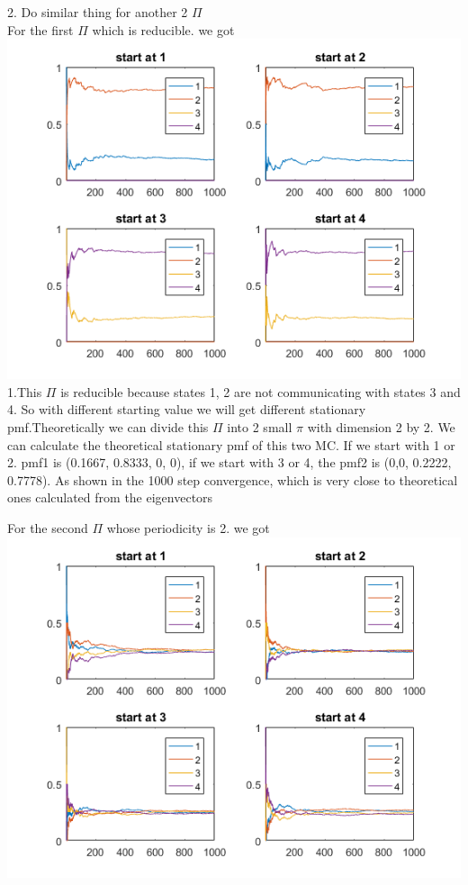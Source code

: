 \documentclass[11pt]{article}
\begin{document}
2. Do similar thing for another 2 $\Pi$\\
For the first $\Pi$ which is reducible. we got\\
\includegraphics[scale=1]{hw2p2.png}
1.This $\Pi$ is reducible because states 1, 2 are not communicating with states 3 and 4. So with different starting value we will get different stationary pmf.Theoretically we can divide this $\Pi$ into 2 small $\pi$ with dimension 2 by 2. We can calculate the theoretical stationary pmf of this two MC. If we start with 1 or 2. pmf1 is (0.1667, 0.8333, 0, 0), if we start with 3 or 4, the pmf2 is (0,0, 0.2222, 0.7778). As shown in the 1000 step convergence, which is very close to theoretical ones calculated from the eigenvectors\\

\bigskip

For the second $\Pi$ whose periodicity is 2. we got\\
\includegraphics[scale=1]{hw2p3.png}
\end{document}
